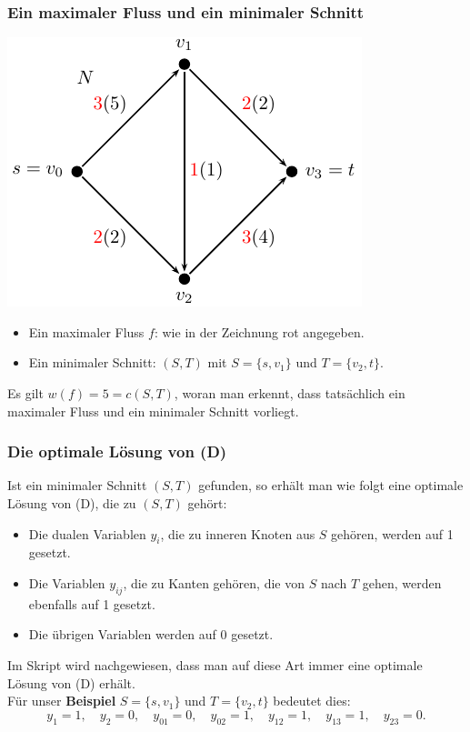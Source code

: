 \documentclass[smaller]{beamer}
\begin{document}
\begin{frame}
\frametitle{Ein maximaler Fluss und ein minimaler Schnitt}

\begin{center}
 \includegraphics{fig64.pdf}
\end{center}

\begin{itemize}
 \item Ein \alert{maximaler Fluss $f$:} wie in der Zeichnung \alert{rot} angegeben.
 \item Ein \alert{minimaler Schnitt:} $(S, T)$ mit $S = \{s, v_1\}$ und $T = \{v_2, t\}$.
\end{itemize}
Es gilt $w(f) = 5 = c(S,T)$, woran man erkennt, dass tatsächlich ein
maximaler Fluss und ein minimaler Schnitt vorliegt.
\end{frame}

\begin{frame}
\frametitle{Die optimale Lösung von (D)}
Ist ein minimaler Schnitt $(S, T)$ gefunden, so erhält man wie folgt eine
\alert{optimale Lösung von (D)}, die zu $(S, T)$ gehört:
\begin{itemize}
 \item Die dualen Variablen $y_i$, die zu inneren Knoten aus $S$ gehören, werden
auf 1 gesetzt.
 \item Die Variablen $y_{ij}$, die zu Kanten gehören, die von $S$ nach $T$ gehen,
werden ebenfalls auf 1 gesetzt.
 \item Die übrigen Variablen werden auf 0 gesetzt.
\end{itemize} \vspace*{0.2cm}
Im Skript wird nachgewiesen, dass man auf diese Art immer eine optimale
Lösung von (D) erhält. \\ \vspace*{0.2cm}
Für unser \textbf{Beispiel} $S = \{s, v_1\}$ und $T = \{v_2, t\}$ bedeutet dies:
\begin{equation} \tag{$\star$}
y_1 = 1, \quad y_2 = 0, \quad y_{01} = 0, \quad y_{02} = 1, \quad y_{12} = 1, \quad  y_{13} = 1, \quad y_{23} = 0.
\end{equation}
\end{frame}
\end{document}
